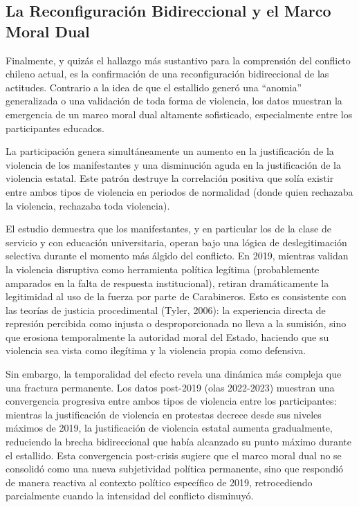 \documentclass[
  13pt,
]{article}
\begin{document}
\subsection{La Reconfiguración Bidireccional y el Marco Moral
Dual}\label{la-reconfiguraciuxf3n-bidireccional-y-el-marco-moral-dual}

Finalmente, y quizás el hallazgo más sustantivo para la comprensión del
conflicto chileno actual, es la confirmación de una reconfiguración
bidireccional de las actitudes. Contrario a la idea de que el estallido
generó una ``anomia'' generalizada o una validación de toda forma de
violencia, los datos muestran la emergencia de un marco moral dual
altamente sofisticado, especialmente entre los participantes educados.

La participación genera simultáneamente un aumento en la justificación
de la violencia de los manifestantes y una disminución aguda en la
justificación de la violencia estatal. Este patrón destruye la
correlación positiva que solía existir entre ambos tipos de violencia en
periodos de normalidad (donde quien rechazaba la violencia, rechazaba
toda violencia).

El estudio demuestra que los manifestantes, y en particular los de la
clase de servicio y con educación universitaria, operan bajo una lógica
de deslegitimación selectiva durante el momento más álgido del
conflicto. En 2019, mientras validan la violencia disruptiva como
herramienta política legítima (probablemente amparados en la falta de
respuesta institucional), retiran dramáticamente la legitimidad al uso
de la fuerza por parte de Carabineros. Esto es consistente con las
teorías de justicia procedimental (Tyler, 2006): la experiencia directa
de represión percibida como injusta o desproporcionada no lleva a la
sumisión, sino que erosiona temporalmente la autoridad moral del Estado,
haciendo que su violencia sea vista como ilegítima y la violencia propia
como defensiva.

Sin embargo, la temporalidad del efecto revela una dinámica más compleja
que una fractura permanente. Los datos post-2019 (olas 2022-2023)
muestran una convergencia progresiva entre ambos tipos de violencia
entre los participantes: mientras la justificación de violencia en
protestas decrece desde sus niveles máximos de 2019, la justificación de
violencia estatal aumenta gradualmente, reduciendo la brecha
bidireccional que había alcanzado su punto máximo durante el estallido.
Esta convergencia post-crisis sugiere que el marco moral dual no se
consolidó como una nueva subjetividad política permanente, sino que
respondió de manera reactiva al contexto político específico de 2019,
retrocediendo parcialmente cuando la intensidad del conflicto disminuyó.
\end{document}
